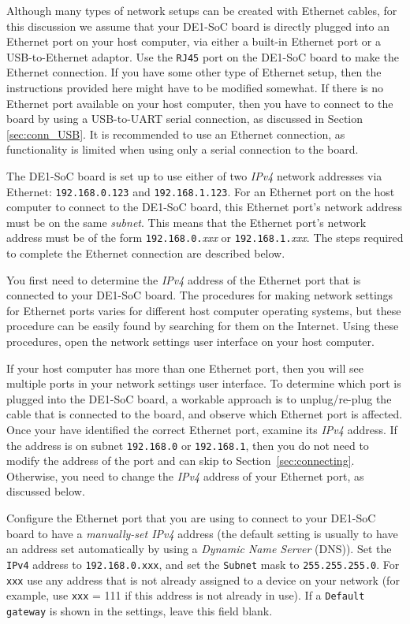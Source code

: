 \documentclass[11pt, twoside, pdftex]{article}
\begin{document}
Although many types of network setups can be created with Ethernet cables, for this discussion
we assume that your DE1-SoC board is directly plugged into an Ethernet port on your host
computer, via either a built-in Ethernet port or a USB-to-Ethernet adaptor. Use the
\texttt{RJ45} port on the DE1-SoC board to make the Ethernet connection. If you
have some other type of Ethernet setup, then the instructions provided here might
have to be modified somewhat. If there is no Ethernet port available on your host computer, 
then you have to connect to the board by using a USB-to-UART serial connection, as discussed
in Section \ref{sec:conn_USB}. It is recommended to use an Ethernet connection, as 
functionality is limited when using only a serial connection to the board. 

The DE1-SoC board is set up to use either of two {\it IPv4} network addresses via 
Ethernet: \texttt{192.168.0.123} and \texttt{192.168.1.123}. For an Ethernet port on 
the host computer to connect to the DE1-SoC board, this Ethernet port's network address 
must be on the same {\it subnet}. This means that the Ethernet port's network address must 
be of the form \texttt{192.168.0.}{\it xxx} or \texttt{192.168.1.}{\it xxx}. 
The steps required to complete the Ethernet connection are described below.

You first need to determine the {\it IPv4} address of the Ethernet port that is connected to your
DE1-SoC board. The procedures for making network settings for Ethernet
ports varies for different host computer operating systems, but these procedure can 
be easily found by searching for them on the Internet. Using these procedures, open the 
network settings user interface on your host computer. 

If your host computer has more than one Ethernet port, then you will see multiple ports in
your network settings user interface. To determine which port is plugged into the DE1-SoC board,
a workable approach is to unplug/re-plug the cable that is connected to the board,
and observe which Ethernet port is
affected. Once your have identified the correct Ethernet port, examine its {\it IPv4} address.
If the address is on subnet \texttt{192.168.0} or \texttt{192.168.1}, then you do not need
to modify the address of the port and can skip to Section~\ref{sec:connecting}. 
Otherwise, you need to change the {\it IPv4} address of your Ethernet port, as discussed
below. 

Configure the Ethernet port that you are using to connect to your DE1-SoC board to 
have a {\it manually-set IPv4} address (the default setting is usually to have an address 
set automatically by using a {\it Dynamic Name Server} (DNS)). Set the \texttt{IPv4} address 
to \texttt{192.168.0.xxx}, and set the \texttt{Subnet} mask to \texttt{255.255.255.0}. 
For \texttt{xxx} use any address that is not already assigned to a device on your network
(for example, use \texttt{xxx} = 111 if this address is not already in use). If a
\texttt{Default gateway} is shown in the settings, leave this field blank.
\end{document}
